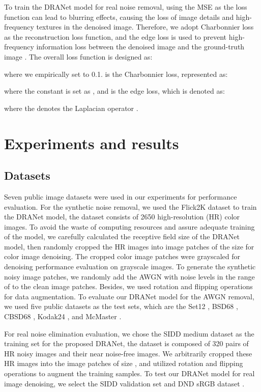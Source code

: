 \documentclass[3p,times]{elsarticle}
\begin{document}
To train the DRANet model for real noise removal, using the MSE as the loss function can lead to blurring effects, causing the loss of image details and high-frequency textures in the denoised image. Therefore, we adopt Charbonnier loss \cite{Lai2017} as the reconstruction loss function, and the edge loss \cite{Jiang2020} is used to prevent high-frequency information loss between the denoised image  and the ground-truth image . The overall loss function is designed as:


\noindent where we empirically set  to 0.1.  is the Charbonnier loss, represented as:


\noindent where the constant  is set as , and  is the edge loss, which is denoted as:

\noindent where the  denotes the Laplacian operator \cite{Kamgar1999}.

\section{Experiments and results}\label{Experiment}
\subsection{Datasets}
Seven public image datasets were used in our experiments for performance evaluation. For the synthetic noise removal, we used the Flick2K dataset \cite{Lim2017} to train the DRANet model, the dataset consists of 2650 high-resolution (HR) color images. To avoid the waste of computing resources and assure adequate training of the model, we carefully calculated the receptive field size of the DRANet model, then randomly cropped the HR images into image patches of the size  for color image denoising. The cropped color image patches were grayscaled for denoising performance evaluation on grayscale images. To generate the synthetic noisy image patches, we randomly add the AWGN with noise levels in the range of  to the clean image patches. Besides, we used rotation and flipping operations for data augmentation. To evaluate our DRANet model for the AWGN removal, we used five public datasets as the test sets, which are the Set12 \cite{Roth2005}, BSD68 \cite{Roth2005}, CBSD68 \cite{Roth2005}, Kodak24 \cite{Kodak24}, and McMaster \cite{Zhang2011}.

For real noise elimination evaluation, we chose the SIDD medium dataset \cite{Abdelhamed2018} as the training set for the proposed DRANet, the dataset is composed of 320 pairs of HR noisy images and their near noise-free images. We arbitrarily cropped these HR images into the image patches of size , and utilized rotation and flipping operations to augment the training samples. To test our DRANet model for real image denoising, we select the SIDD validation set \cite{Abdelhamed2018} and DND sRGB dataset \cite{Plotz2017}.
\end{document}
